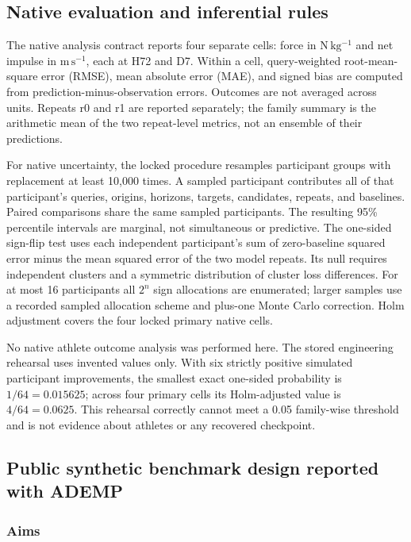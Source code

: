 \documentclass[12pt,a4paper]{article}
\begin{document}
\subsection{Native evaluation and inferential rules}

The native analysis contract reports four separate cells: force in \(\mathrm{N\,kg^{-1}}\) and net impulse in \(\mathrm{m\,s^{-1}}\), each at H72 and D7. Within a cell, query-weighted root-mean-square error (RMSE), mean absolute error (MAE), and signed bias are computed from prediction-minus-observation errors. Outcomes are not averaged across units. Repeats r0 and r1 are reported separately; the family summary is the arithmetic mean of the two repeat-level metrics, not an ensemble of their predictions.

For native uncertainty, the locked procedure resamples participant groups with replacement at least 10,000 times. A sampled participant contributes all of that participant's queries, origins, horizons, targets, candidates, repeats, and baselines. Paired comparisons share the same sampled participants. The resulting 95\% percentile intervals are marginal, not simultaneous or predictive. The one-sided sign-flip test uses each independent participant's sum of zero-baseline squared error minus the mean squared error of the two model repeats. Its null requires independent clusters and a symmetric distribution of cluster loss differences. For at most 16 participants all \(2^n\) sign allocations are enumerated; larger samples use a recorded sampled allocation scheme and plus-one Monte Carlo correction. Holm adjustment covers the four locked primary native cells.

No native athlete outcome analysis was performed here. The stored engineering rehearsal uses invented values only. With six strictly positive simulated participant improvements, the smallest exact one-sided probability is \(1/64=0.015625\); across four primary cells its Holm-adjusted value is \(4/64=0.0625\). This rehearsal correctly cannot meet a 0.05 family-wise threshold and is not evidence about athletes or any recovered checkpoint.

\subsection{Public synthetic benchmark design reported with ADEMP}

\subsubsection{Aims}
\end{document}
